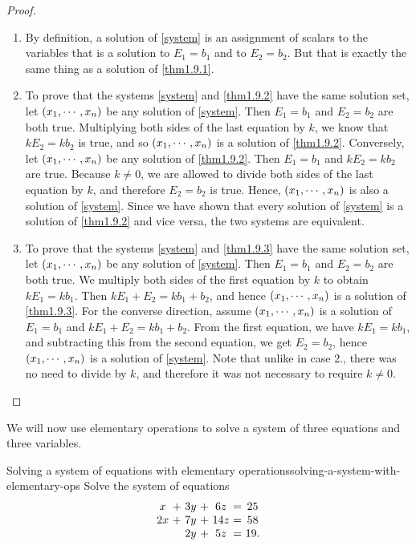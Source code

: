 \begin{proof} 
\begin{enumerate}
\item By definition, a solution of \eqref{system} is an assignment of
  scalars to the variables that is a solution to $E_1=b_1$ and to
  $E_2=b_2$. But that is exactly the same thing as a solution of
  \eqref{thm1.9.1}.

\item To prove that the systems \eqref{system} and \eqref{thm1.9.2}
  have the same solution set, let $\left(x_{1},\cdots,x_{n}\right)$ be
  any solution of \eqref{system}. Then $E_1=b_1$ and $E_2=b_2$ are
  both true. Multiplying both sides of the last equation by $k$, we
  know that $kE_2=kb_2$ is true, and so
  $\left(x_{1},\cdots,x_{n}\right)$ is a solution of
  \eqref{thm1.9.2}. Conversely, let $\left(x_{1},\cdots,x_{n}\right)$
  be any solution of \eqref{thm1.9.2}.  Then $E_1=b_1$ and $kE_2=kb_2$
  are true. Because $k\neq 0$, we are allowed to divide both sides of
  the last equation by $k$, and therefore $E_2=b_2$ is true. Hence,
  $\left(x_{1},\cdots,x_{n}\right)$ is also a solution of
  \eqref{system}. Since we have shown that every solution of
  \eqref{system}  is a solution of \eqref{thm1.9.2} and vice versa,
  the two systems are equivalent.

\item To prove that the systems \eqref{system} and \eqref{thm1.9.3}
  have the same solution set, let $\left(x_{1},\cdots,x_{n}\right)$ be
  any solution of \eqref{system}. Then $E_1=b_1$ and $E_2=b_2$ are
  both true. We multiply both sides of the first equation by $k$ to
  obtain $kE_1=kb_1$. Then $kE_1+E_2 = kb_1+b_2$, and hence
  $\left(x_{1},\cdots,x_{n}\right)$ is a solution of
  \eqref{thm1.9.3}. For the converse direction, assume
  $\left(x_{1},\cdots,x_{n}\right)$ is a solution of $E_1=b_1$ and
  $kE_1+E_2 = kb_1+b_2$. From the first equation, we have $kE_1=kb_1$,
  and subtracting this from the second equation, we get $E_2=b_2$,
  hence $\left(x_{1},\cdots,x_{n}\right)$ is a solution of
  \eqref{system}. Note that unlike in case 2., there was no need to
  divide by $k$, and therefore it was not necessary to require $k\neq 0$.
\end{enumerate}
\end{proof}

We will now use elementary operations to solve a system of three
equations and three variables.

\begin{example}{Solving a system of equations with elementary operations}{solving-a-system-with-elementary-ops}
Solve the system of equations
\begin{equation*}
\begin{array}{c@{~}c@{~}c@{~}c@{~}c@{~}c@{~}c}
x&+&3y&+&6z&=&25 \\
2x&+&7y&+&14z&=&58 \\
&&2y&+&5z&=&19.
\end{array}
\label{solvingasystem1}
\end{equation*}
\end{example}

